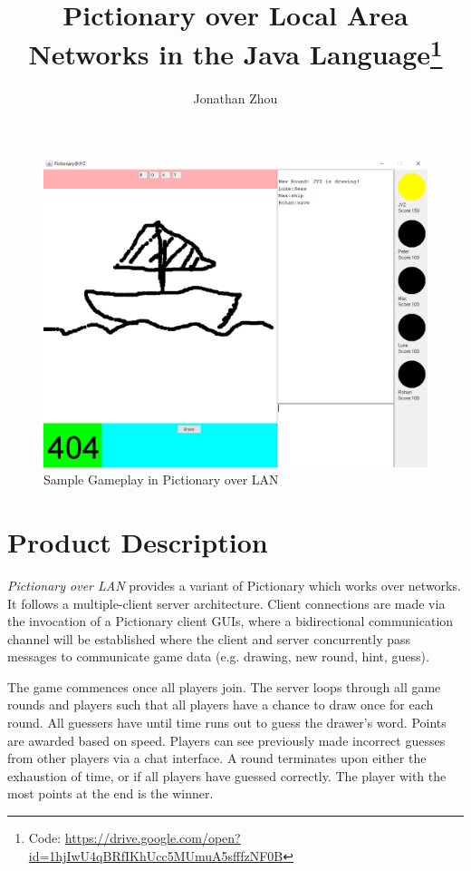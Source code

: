 \documentclass[12pt,letterpaper]{article}
\author{Jonathan Zhou}
\title{Pictionary over Local Area Networks in the Java Language\footnote{Code: \url{https://drive.google.com/open?id=1hjIwU4qBRfIKhUcc5MUmuA5sfffzNF0B}}}
\begin{document}
\maketitle

\begin{figure}[H]
\centering
\includegraphics[width=5in]{sampleGameplay.PNG}

\caption{Sample Gameplay in Pictionary over LAN}
\end{figure}
\thispagestyle{empty}

\newpage

\doublespacing

\section*{Product Description}

\textit{Pictionary over LAN} provides a variant of Pictionary which works over networks. It follows a multiple-client server architecture. Client connections are made via the invocation of a Pictionary client GUIs, where a bidirectional communication channel will be established where the client and server concurrently pass messages to communicate game data (e.g. drawing, new round, hint, guess).

The game commences once all players join. The server loops through all game rounds and players such that all players have a chance to draw once for each round. All guessers have until time runs out to guess the drawer's word. Points are awarded based on speed. Players can see previously made incorrect guesses from other players via a chat interface. A round terminates upon either the exhaustion of time, or if all players have guessed correctly. The player with the most points at the end is the winner.
\end{document}
